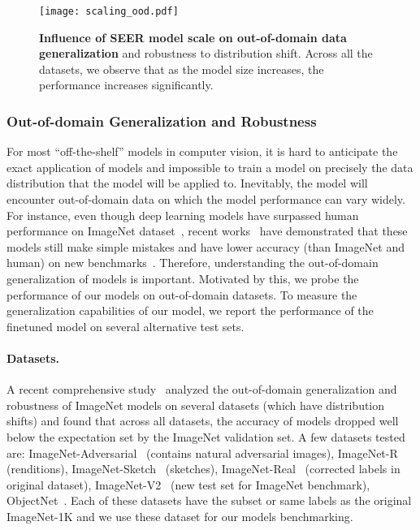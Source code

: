 \documentclass[10pt,twocolumn,letterpaper]{article}
\newcommand{\ImNet}{ImageNet-1K\xspace}
\begin{document}
\begin{figure*}[t]
  \centering
    \texttt{[image: scaling\_ood.pdf]}
  \caption{
    \textbf{Influence of SEER model scale on out-of-domain data generalization} and robustness to distribution shift. Across all the datasets, we observe that as the model size increases, the performance increases significantly.
  }
  \label{fig:ood_scaling_trend}
\end{figure*}

\subsubsection{Out-of-domain Generalization and Robustness}
\label{sec:ood_section}
For most ``off-the-shelf'' models in computer vision, it is hard to anticipate the exact application of models and impossible to train a model on precisely the data distribution that the model will be applied to. Inevitably, the model will encounter out-of-domain data on which the model performance can vary widely. For instance, even though deep learning models have surpassed human performance on ImageNet dataset~\cite{he2016deep}, recent works~\cite{dodge2017study,alcorn2019strike} have demonstrated that these models still make simple mistakes and have lower accuracy (than ImageNet and human) on new benchmarks~\cite{objectnet2019,recht2019imagenet}. Therefore, understanding the out-of-domain generalization of models is important. Motivated by this, we probe the performance of our models on out-of-domain datasets. To measure the generalization capabilities of our model, we report the performance of the finetuned model on several alternative test sets.

\paragraph{Datasets.}
A recent comprehensive study~\cite{miller2021accuracy} analyzed the out-of-domain generalization and robustness of ImageNet models on several datasets (which have distribution shifts) and found that across all datasets, the accuracy of models dropped well below the expectation set by the ImageNet validation set. A few datasets tested are: ImageNet-Adversarial~\cite{hendrycks2021natural} (contains natural adversarial images), ImageNet-R~\cite{hendrycks2021many} (renditions), ImageNet-Sketch~\cite{wangh2019learning} (sketches), ImageNet-Real~\cite{beyer2020we} (corrected labels in original dataset), ImageNet-V2~\cite{recht2019imagenet} (new test set for ImageNet benchmark), ObjectNet~\cite{objectnet2019}. Each of these datasets have the subset or same labels as the original \ImNet and we use these dataset for our models benchmarking.
\end{document}
